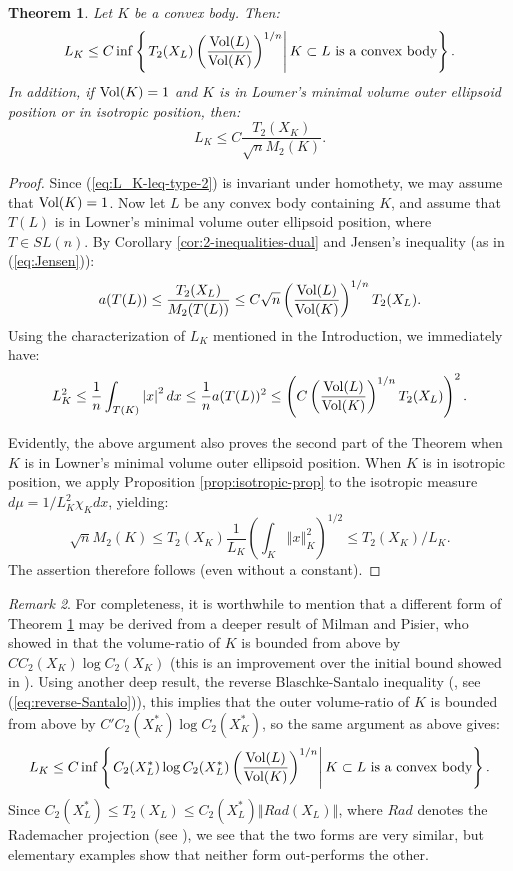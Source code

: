 \documentclass[12pt,oneside]{amsart}
\newtheorem{thm}{Theorem}[section] %
\theoremstyle{definition}
\theoremstyle{remark}
\newtheorem{rem}[thm]{Remark}
\theoremstyle{proof}
\numberwithin{equation}{section}
\newcommand{\norm}[1]{\left\Vert#1\right\Vert}
\newcommand{\abs}[1]{\left\vert#1\right\vert}
\newcommand{\set}[1]{\left\{#1\right\}}
\newcommand{\brac}[1]{\left(#1\right)}
\newcommand{\Vol}[1]{\textnormal{Vol} (#1)}
\newcommand{\VolRatio}[2]{\brac{\frac{\Vol{#1}}{\Vol{#2}}}^{1/n}}
\begin{document}

\begin{thm} \label{thm:L_K-leq-type-2}
Let $K$ be a convex body. Then:
\begin{equation} \label{eq:L_K-leq-type-2}
L_K \leq C \inf \set{\left . T_2(X_L) \VolRatio{L}{K} \right | K
\subset L \textrm{ is a convex body} }.
\end{equation}
In addition, if $\Vol{K} = 1$ and $K$ is in Lowner's minimal
volume outer ellipsoid position or in isotropic position, then:
\[
L_K \leq C \frac{T_2(X_K)}{\sqrt{n} M_2(K)}.
\]
\end{thm}
\begin{proof}
Since (\ref{eq:L_K-leq-type-2}) is invariant under homothety, we
may assume that $\Vol{K}=1$. Now let $L$ be any convex body
containing $K$, and assume that $T(L)$ is in Lowner's minimal
volume outer ellipsoid position, where $T \in SL(n)$. By Corollary
\ref{cor:2-inequalities-dual} and Jensen's inequality (as in
(\ref{eq:Jensen})):
\[
a(T(L)) \leq \frac{T_2(X_L)}{M_2(T(L))} \leq C \sqrt{n}
\VolRatio{L}{K} T_2(X_L).
\]
Using the characterization of $L_K$ mentioned in the Introduction,
we immediately have:
\[
L_K^2 \leq \frac{1}{n} \int_{T(K)} \abs{x}^2 dx \leq \frac{1}{n}
a(T(L))^2 \leq \brac{C \VolRatio{L}{K} T_2(X_L)}^2.
\]

Evidently, the above argument also proves the second part of the
Theorem when $K$ is in Lowner's minimal volume outer ellipsoid
position. When $K$ is in isotropic position, we apply Proposition
\ref{prop:isotropic-prop} to the isotropic measure $d\mu = 1/L_K^2
\chi_K dx$, yielding:
\[
\sqrt{n} M_2(K) \leq T_2(X_K) \frac{1}{L_K} \brac{\int_K
\norm{x}^2_K}^{1/2} \leq T_2(X_K) / L_K.
\]
The assertion therefore follows (even without a constant).
\end{proof}
\begin{rem}
For completeness, it is worthwhile to mention that a different
form of Theorem \ref{thm:L_K-leq-type-2} may be derived from a
deeper result of Milman and Pisier, who showed in
\cite{Milman-Pisier} that the volume-ratio of $K$ is bounded from
above by $C C_2(X_K) \log C_2(X_K)$ (this is an improvement over
the initial bound showed in
\cite{Bourgain-Milman-vr-and-reverse-santalo}). Using another
deep result, the reverse Blaschke-Santalo inequality
(\cite{Bourgain-Milman-vr-and-reverse-santalo}, see
(\ref{eq:reverse-Santalo})), this implies that the outer
volume-ratio of $K$ is bounded from above by $C' C_2(X^*_K) \log
C_2(X^*_K)$, so the same argument as above gives:
\[
L_K \leq C \inf \set{\left . C_2(X^*_L) \log C_2(X^*_L)
\VolRatio{L}{K} \right | K \subset L \textrm{ is a convex body} }.
\]
Since $ C_2(X^*_L) \leq T_2(X_L) \leq C_2(X^*_L) \norm{Rad(X_L)}
$, where $Rad$ denotes the Rademacher projection (see
\cite{Milman-Schechtman-Book}), we see that the two forms are very
similar, but elementary examples show that neither form
out-performs the other.
\end{rem}
\end{document}
